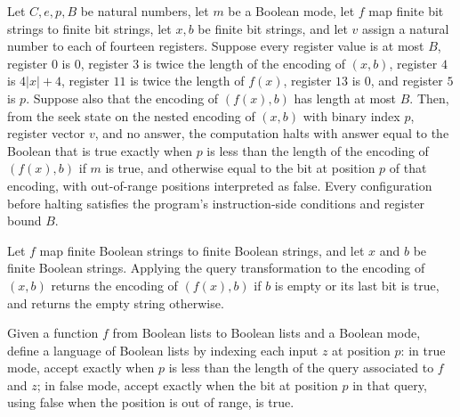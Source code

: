 \begin{lemma}
\label{Complexity.comp_lookup_run}
\leanok
{}
Let $C,e,p,B$ be natural numbers, let $m$ be a Boolean mode, let $f$ map finite bit
strings to finite bit strings, let $x,b$ be finite bit strings, and let $v$ assign a
natural number to each of fourteen registers. Suppose every register value is at most
$B$, register $0$ is $0$, register $3$ is twice the length of the encoding of $(x,b)$,
register $4$ is $4|x|+4$, register $11$ is twice the length of $f(x)$, register $13$ is
$0$, and register $5$ is $p$. Suppose also that the encoding of $(f(x),b)$ has length at
most $B$. Then, from the seek state on the nested encoding of $(x,b)$ with binary index
$p$, register vector $v$, and no answer, the computation halts with answer equal to the
Boolean that is true exactly when $p$ is less than the length of the encoding of
$(f(x),b)$ if $m$ is true, and otherwise equal to the bit at position $p$ of that
encoding, with out-of-range positions interpreted as false. Every configuration before
halting satisfies the program’s instruction-side conditions and register bound $B$.
\end{lemma}

\begin{lemma}
\label{Complexity.compQ_field}
\leanok
{}
Let $f$ map finite Boolean strings to finite Boolean strings, and let $x$ and $b$ be
finite Boolean strings. Applying the query transformation to the encoding of $(x,b)$
returns the encoding of $(f(x),b)$ if $b$ is empty or its last bit is true, and returns
the empty string otherwise.
\end{lemma}

\begin{definition}
\label{Complexity.compLang}
\leanok
{}
Given a function $f$ from Boolean lists to Boolean lists and a Boolean mode, define a
language of Boolean lists by indexing each input $z$ at position $p$: in true mode,
accept exactly when $p$ is less than the length of the query associated to $f$ and $z$;
in false mode, accept exactly when the bit at position $p$ in that query, using false
when the position is out of range, is true.
\end{definition}

